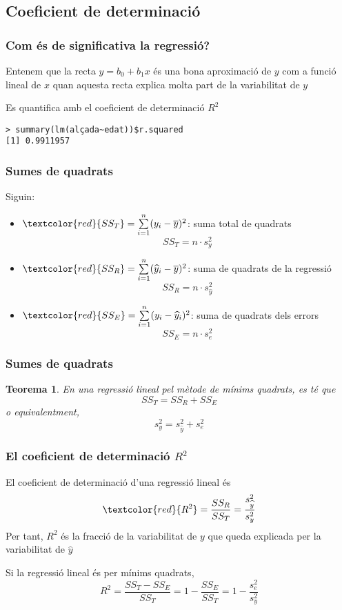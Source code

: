 \documentclass[12pt,t]{beamer}
\newcommand{\red}[1]{\textcolor{red}{#1}}
\renewcommand{\emph}[1]{{\color{red}#1}}
\theoremstyle{plain}
\newtheorem{teorema}{Teorema}
\theoremstyle{definition}
\begin{document}
\subsection{Coeficient de determinació}
\begin{frame}[fragile]
\frametitle{Com és de significativa la regressió?}

Entenem que la recta $\widehat{y}=b_0+b_1x$ és una bona aproximació de $y$ com a funció lineal de $x$ quan 
aquesta recta explica
molta part de la variabilitat de $y$\bigskip
\bigskip

Es quantifica amb el \emph{coeficient de determinació $R^2$}
\begin{verbatim}
> summary(lm(alçada~edat))$r.squared
[1] 0.9911957
\end{verbatim}

\end{frame}

\begin{frame}
\frametitle{Sumes de quadrats}
Siguin:
\begin{itemize}
\item $\red{SS_T} =\sum\limits_{i=1}^n(y_i-\overline{y})^2$: suma total de quadrats
$$
SS_T=n\cdot s_y^2
$$

\item $\red{SS_R}=\sum\limits_{i=1}^n(\widehat{y}_i-\overline{y})^2$: suma de quadrats de la regressió 
$$
SS_R=n\cdot s_{\widehat{y}}^2
$$

\item $\red{SS_E}=\sum\limits_{i=1}^n(y_i-\widehat{y}_i)^2$: suma de quadrats dels errors
$$
SS_E=n\cdot s_e^2
$$
\end{itemize}

\end{frame}

\begin{frame}
\frametitle{Sumes de quadrats}

\begin{teorema}
En una regressió lineal pel mètode de mínims quadrats, es té que
$$
SS_T=SS_R+SS_E
$$
o equivalentment,
$$
s^2_y=s^2_{\widehat{y}}+s^2_e
$$
\end{teorema}

\end{frame}

\begin{frame}
\frametitle{El coeficient de determinació $R^2$}
El \emph{coeficient de determinació} d'una regressió lineal és
$$
\red{R^2}=\frac{SS_R}{SS_T}=\frac{s_{\widehat{y}}^2}{s_y^2}
$$
Per tant, $R^2$ és la fracció de la variabilitat de $y$ que queda explicada per la variabilitat de $\widehat{y}$
\bigskip


Si la regressió lineal és per mínims quadrats,
$$
R^2=\frac{SS_T-SS_E}{SS_T}=1-\frac{SS_E}{SS_T}=1-\frac{s_e^2}{s_y^2}
$$
\end{frame}
\end{document}
